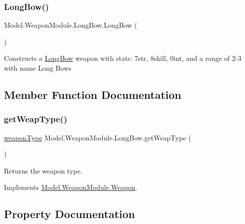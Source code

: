 \subsubsection{\texorpdfstring{Long\+Bow()}{LongBow()}}
{\footnotesize\ttfamily Model.\+Weapon\+Module.\+Long\+Bow.\+Long\+Bow (\begin{DoxyParamCaption}{ }\end{DoxyParamCaption})\hspace{0.3cm}{\ttfamily [inline]}}

Constructs a \hyperlink{class_model_1_1_weapon_module_1_1_long_bow}{Long\+Bow} weapon with stats\+: 7str, 8skill, 0int, and a range of 2-\/3 with name Long Bows 

\subsection{Member Function Documentation}
\hypertarget{class_model_1_1_weapon_module_1_1_long_bow_aca2986d43dcefb1f3d99c6507a4390cd}{}\label{class_model_1_1_weapon_module_1_1_long_bow_aca2986d43dcefb1f3d99c6507a4390cd} 
\subsubsection{\texorpdfstring{get\+Weap\+Type()}{getWeapType()}}
{\footnotesize\ttfamily \hyperlink{namespace_model_1_1_weapon_module_a3390c266f89e3399c2bc7fa31f13cbec}{weapon\+Type} Model.\+Weapon\+Module.\+Long\+Bow.\+get\+Weap\+Type (\begin{DoxyParamCaption}{ }\end{DoxyParamCaption})\hspace{0.3cm}{\ttfamily [inline]}}

Returns the weapon type. 

Implements \hyperlink{interface_model_1_1_weapon_module_1_1_weapon_a175133855ef446d3d87c70d13979be9c}{Model.\+Weapon\+Module.\+Weapon}.



\subsection{Property Documentation}
\hypertarget{class_model_1_1_weapon_module_1_1_long_bow_a0a9b8b342ba911bc9d39ea5c388a9241}{}\label{class_model_1_1_weapon_module_1_1_long_bow_a0a9b8b342ba911bc9d39ea5c388a9241} 
